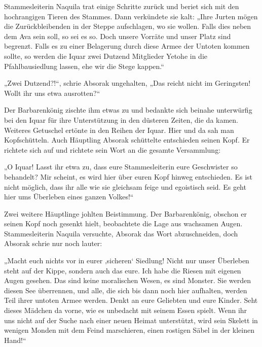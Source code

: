 Stammesleiterin Naquila trat einige Schritte zurück und beriet sich mit den hochrangigen Tieren des Stammes. Dann verkündete sie kalt: „Ihre Jurten mögen die Zurückbleibenden in der Steppe aufschlagen, wo sie wollen. Falls dies neben dem Ava sein soll, so sei es so. Doch unsere Vorräte und unser Platz sind begrenzt. Falls es zu einer Belagerung durch diese Armee der Untoten kommen sollte, so werden die Iquar zwei Dutzend Mitglieder Yetohe in die Pfahlbausiedlung lassen, ehe wir die Stege kappen.“

„Zwei Dutzend?!“, schrie Absorak ungehalten, „Das reicht nicht im Geringsten! Wollt ihr uns etwa ausrotten?“

Der Barbarenkönig zischte ihm etwas zu und bedankte sich beinahe unterwürfig bei den Iquar für ihre Unterstützung in den düsteren Zeiten, die da kamen. Weiteres Getuschel ertönte in den Reihen der Iquar. Hier und da sah man Kopfschütteln. Auch Häuptling Absorak schüttelte entschieden seinen Kopf. Er richtete sich auf und richtete sein Wort an die gesamte Versammlung:

„O Iquar! Lasst ihr etwa zu, dass eure Stammesleiterin eure Geschwister so behandelt? Mir scheint, es wird hier über euren Kopf hinweg entschieden. Es ist nicht möglich, dass ihr alle wie sie gleichsam feige und egoistisch seid. Es geht hier ums Überleben eines ganzen Volkes!“

Zwei weitere Häuptlinge johlten Beistimmung. Der Barbarenkönig, obschon er seinen Kopf noch gesenkt hielt, beobachtete die Lage aus wachsamen Augen. Stammesleiterin Naquila versuchte, Absorak das Wort abzuschneiden, doch Absorak schrie nur noch lauter:

„Macht euch nichts vor in eurer ‚sicheren‘ Siedlung! Nicht nur unser Überleben steht auf der Kippe, sondern auch das eure. Ich habe die Riesen mit eigenen Augen gesehen. Das sind keine moralischen Wesen, es sind Monster. Sie werden diesen See überrennen, und alle, die sich bis dann noch hier aufhalten, werden Teil ihrer untoten Armee werden. Denkt an eure Geliebten und eure Kinder. Seht dieses Mädchen da vorne, wie es unbedacht mit seinem Essen spielt. Wenn ihr uns nicht auf der Suche nach einer neuen Heimat unterstützt, wird sein Skelett in wenigen Monden mit dem Feind marschieren, einen rostigen Säbel in der kleinen Hand!“

